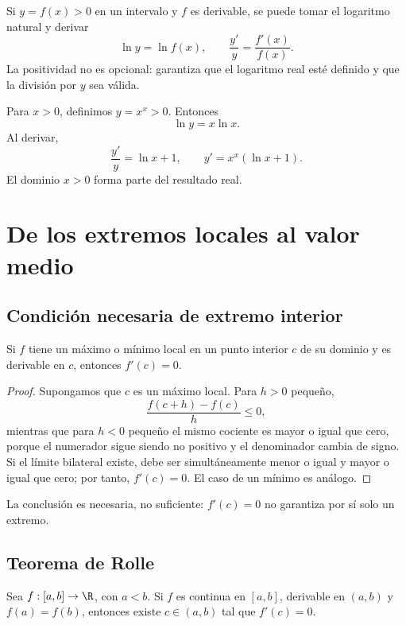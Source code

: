 Si \(y=f(x)>0\) en un intervalo y \(f\) es derivable, se puede tomar el
logaritmo natural y derivar
\[
  \ln y=\ln f(x),
  \qquad
  \frac{y'}y=\frac{f'(x)}{f(x)}.
\]
La positividad no es opcional: garantiza que el logaritmo real esté definido y
que la división por \(y\) sea válida.

\begin{ejemplo}
Para \(x>0\), definimos \(y=x^x>0\). Entonces
\[
  \ln y=x\ln x.
\]
Al derivar,
\[
  \frac{y'}y=\ln x+1,
  \qquad
  y'=x^x(\ln x+1).
\]
El dominio \(x>0\) forma parte del resultado real.
\end{ejemplo}

\section{De los extremos locales al valor medio}
\label{sec:rolle-valor-medio}

\subsection{Condición necesaria de extremo interior}

\begin{teorema}
Si \(f\) tiene un máximo o mínimo local en un punto interior \(c\) de su
dominio y es derivable en \(c\), entonces \(f'(c)=0\).
\end{teorema}

\begin{proof}
Supongamos que \(c\) es un máximo local. Para \(h>0\) pequeño,
\[
  \frac{f(c+h)-f(c)}h\le0,
\]
mientras que para \(h<0\) pequeño el mismo cociente es mayor o igual que cero,
porque el numerador sigue siendo no positivo y el denominador cambia de signo.
Si el límite bilateral existe, debe ser simultáneamente menor o igual y mayor
o igual que cero; por tanto, \(f'(c)=0\). El caso de un mínimo es análogo.
\end{proof}

La conclusión es necesaria, no suficiente: \(f'(c)=0\) no garantiza por sí
solo un extremo.

\subsection{Teorema de Rolle}

\begin{teorema}
Sea \(f:[a,b]\to\R\), con \(a<b\). Si \(f\) es continua en \([a,b]\),
derivable en \((a,b)\) y \(f(a)=f(b)\), entonces existe \(c\in(a,b)\) tal
que \(f'(c)=0\).
\end{teorema}


